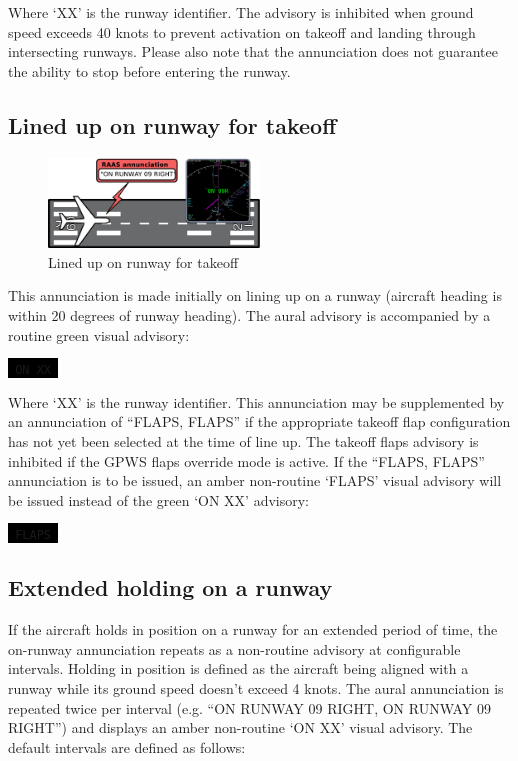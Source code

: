\documentclass[a4paper,12pt]{article}
\newcommand{\visualadvisory}[3][b]{%
    \ifthenelse{\equal{#1}{b}}{\begin{center}}{}
    \noindent
    \colorbox{black}{\textcolor{#2visualadvisorycolor}{\large\texttt{~#3~}}}
    \ifthenelse{\equal{#1}{b}}{\end{center}}{}}
\begin{document}
\noindent Where `XX' is the runway identifier. The advisory is inhibited
when ground speed exceeds 40 knots to prevent activation on takeoff and
landing through intersecting runways. Please also note that the
annunciation does not guarantee the ability to stop before entering the
runway.

\newpage

\subsection{Lined up on runway for takeoff}
\label{subsec:OnRwyMon}

\begin{figure}
\begin{center}
\includegraphics[width=0.5\textwidth]{../src/on_rwy.pdf}
\end{center}
\caption{Lined up on runway for takeoff}
\end{figure}

This annunciation is made initially on lining up on a runway (aircraft
heading is within 20 degrees of runway heading).  The aural advisory is
accompanied by a routine green visual advisory:

\visualadvisory{routine}{ON XX}

\noindent Where `XX' is the runway identifier. This annunciation may be
supplemented by an annunciation of ``FLAPS, FLAPS'' if the appropriate
takeoff flap configuration has not yet been selected at the time of line
up. The takeoff flaps advisory is inhibited if the GPWS flaps override
mode is active. If the ``FLAPS, FLAPS'' annunciation is to be issued, an
amber non-routine `FLAPS' visual advisory will be issued instead of the
green `ON XX' advisory:

\visualadvisory{nonroutine}{FLAPS}

\subsection{Extended holding on a runway}
\label{subsec:ExtHoldingMon}

If the aircraft holds in position on a runway for an extended period of
time, the on-runway annunciation repeats as a non-routine advisory at
configurable intervals. Holding in position is defined as the aircraft
being aligned with a runway while its ground speed doesn't exceed 4
knots. The aural annunciation is repeated twice per interval (e.g. ``ON
RUNWAY 09 RIGHT, ON RUNWAY 09 RIGHT'') and displays an amber non-routine
`ON XX' visual advisory. The default intervals are defined as follows:
\end{document}

